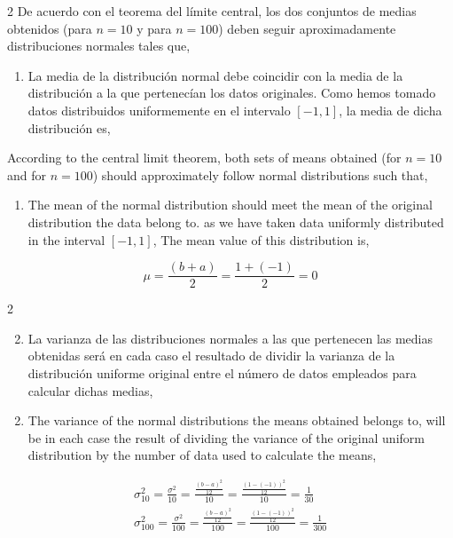 \begin{paracol}{2}
De acuerdo con el teorema del límite central, los dos conjuntos de medias obtenidos (para $n=10$ y para $n=100$) deben seguir aproximadamente distribuciones normales tales que,
\begin{enumerate}
\item La media de la distribución normal debe coincidir con la media de la distribución a la que pertenecían los datos originales. Como hemos tomado datos distribuidos uniformemente en el intervalo $[-1,1]$, la media de dicha distribución es,
\end{enumerate}
\switchcolumn
According to the central limit theorem, both sets of means obtained (for $n=10$ and for $n=100$) should approximately follow normal distributions such that, 
\begin{enumerate}
	\item The mean of the normal distribution sho\-uld meet the mean of the original distribution the data belong to. as we have taken data uniformly distributed in the interval $[-1,1]$, The mean value of this distribution is,
\end{enumerate}

\end{paracol}
\begin{equation*}
\mu = \frac{(b+a)}{2}=\frac{1+(-1)}{2}=0
\end{equation*}
\begin{paracol}{2}
\begin{enumerate}
\setcounter{enumi}{1}
\item La varianza de las distribuciones normales a las que pertenecen las medias obtenidas será en cada caso el resultado de dividir la varianza de la distribución uniforme original entre el número de datos empleados para calcular dichas medias,
\end{enumerate}
\switchcolumn
\begin{enumerate}
	\setcounter{enumi}{1}
	\item The variance of the normal distributions the means obtained belongs to, will be in each case the result of dividing the variance of the original uniform distribution by the number of data used to calculate the means, 
\end{enumerate}
\end{paracol}

\begin{align*}
\sigma_{10}^2 = \frac{\sigma^2}{10}=\frac{\frac{(b-a)^2}{12}}{10}=\frac{\frac{(1-(-1))^2}{12}}{10}=\frac{1}{30}\\
\sigma_{100}^2 = \frac{\sigma^2}{100}=\frac{\frac{(b-a)^2}{12}}{100}=\frac{\frac{(1-(-1))^2}{12}}{100}=\frac{1}{300}
\end{align*}

